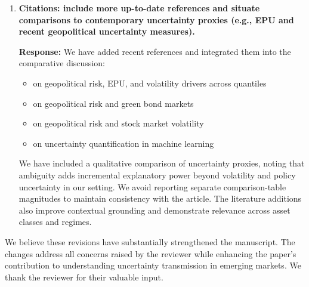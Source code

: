 \documentclass[12pt]{article}
\begin{document}
\begin{enumerate}
    \begin{responsebox}
    \vspace{0.5cm}
    \textbf{Response:} We have added to the IV section and briefly summarized diagnostics:

    \textit{``We report standard IV diagnostics indicating strong instruments and validity: first-stage statistics exceed conventional thresholds, and overidentification tests fail to reject instrument exogeneity.''}
    
    \vspace{0.5cm}
    We have also summarized weak-instrument robustness checks (e.g., conditional F statistics) and provided references to diagnostic tables in the appendix for transparency. This enrichment clarifies instrument relevance and exogeneity and aligns with best practice.
    \end{responsebox}

    \item \textbf{Citations: include more up-to-date references and situate comparisons to contemporary uncertainty proxies (e.g., EPU and recent geopolitical uncertainty measures).}

    \begin{responsebox}
    \vspace{0.5cm}
    \textbf{Response:} We have added recent references and integrated them into the comparative discussion:

    \begin{itemize}
        \item \citet{Bouri2024} on geopolitical risk, EPU, and volatility drivers across quantiles
        \item \citet{Liu2024} on geopolitical risk and green bond markets
        \item \citet{Zhang2023} on geopolitical risk and stock market volatility
        \item \citet{Nemani2023} on uncertainty quantification in machine learning
    \end{itemize}

    \vspace{0.5cm}
    We have included a qualitative comparison of uncertainty proxies, noting that ambiguity adds incremental explanatory power beyond volatility and policy uncertainty in our setting. We avoid reporting separate comparison-table magnitudes to maintain consistency with the article. The literature additions also improve contextual grounding and demonstrate relevance across asset classes and regimes.
    \end{responsebox}

\end{enumerate}



We believe these revisions have substantially strengthened the manuscript. The changes address all concerns raised by the reviewer while enhancing the paper's contribution to understanding uncertainty transmission in emerging markets. We thank the reviewer for their valuable input.



\end{document}
